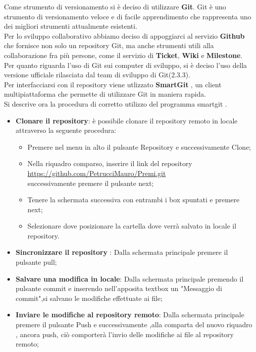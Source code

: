 Come strumento di versionamento si \`{e} deciso di utilizzare \textbf{Git}.
Git \`{e} uno strumento di versionamento veloce e di facile apprendimento che
rappresenta uno dei migliori strumenti attualmente esistenti.\\ Per lo sviluppo collaborativo abbiamo deciso di appoggiarci al servizio \textbf{Github} che fornisce non solo un repository Git, ma anche strumenti utili alla collaborazione fra pi\`{u} persone, come il servizio di \textbf{Ticket}, \textbf{Wiki} e \textbf{Milestone}.\\
Per quanto riguarda l’uso di Git sui computer di sviluppo, si \`{e} deciso l’uso
della versione ufficiale rilasciata dal team di sviluppo di Git(2.3.3).\\
Per interfacciarsi con il repository viene utlizzato \textbf{SmartGit} , un client multipiattaforma che permette di utilizzare Git in maniera rapida.\\
Si descrive ora la procedura di corretto utilizzo del programma smartgit .
\begin{itemize}

\item 	\textbf{Clonare il repository}: \`{e} possibile clonare il repository remoto in locale attraverso la seguente procedura:

\begin{itemize}
\item Premere nel menu in alto il pulsante Repository e successivamente Clone;
\item Nella riquadro comparso, inserire il link del repository\\ \url{https://github.com/PetrucciMauro/Premi.git}\\successivamente premere il pulsante  next;
\item Tenere la schermata successiva con entrambi i box spuntati e premere next;
\item Selezionare dove posizionare la cartella dove verr\`{a} salvato in locale il repository.
\end{itemize}
\item \textbf{Sincronizzare il repository} : Dalla schermata principale premere il pulsante pull; 
\item \textbf{Salvare una modifica in locale}: Dalla schermata principale premendo il pulsante commit e inserendo nell'apposita textbox un "Messaggio di commit",si salvano le modifiche effettuate ai file;
\item \textbf{Inviare le modifiche al repository remoto}: Dalla schermata principale premere il pulsante Push e successivamente ,alla comparta del nuovo riquadro , ancora push, ci\`{o} comporter\`{a} l'invio delle modifiche ai file al repository remoto;

\end{itemize}

